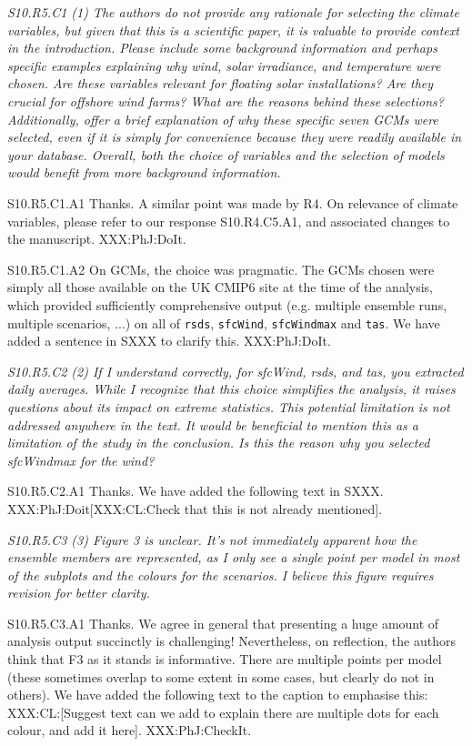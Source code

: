 \documentclass[a4paper,10pt]{article}
\providecommand{\RS}{\texttt{rsds}\xspace}
\providecommand{\WS}{\texttt{sfcWind}\xspace}
\providecommand{\WM}{\texttt{sfcWindmax}\xspace}
\providecommand{\TA}{\texttt{tas}\xspace}
\begin{document}
	\emph{S10.R5.C1 (1) The authors do not provide any rationale for selecting the climate variables, but given that this is a scientific paper, it is valuable to provide context in the introduction. Please include some background information and perhaps specific examples explaining why wind, solar irradiance, and temperature were chosen. Are these variables relevant for floating solar installations? Are they crucial for offshore wind farms? What are the reasons behind these selections? Additionally, offer a brief explanation of why these specific seven GCMs were selected, even if it is simply for convenience because they were readily available in your database. Overall, both the choice of variables and the selection of models would benefit from more background information.}

	S10.R5.C1.A1 Thanks. A similar point was made by R4. On relevance of climate variables, please refer to our response S10.R4.C5.A1, and associated changes to the manuscript. XXX:PhJ:DoIt.
	
	S10.R5.C1.A2 On GCMs, the choice was pragmatic. The GCMs chosen were simply all those available on the UK CMIP6 site at the time of the analysis, which provided sufficiently comprehensive output (e.g. multiple ensemble runs, multiple scenarios, ...) on all of \RS, \WS, \WM and \TA. We have added a sentence in SXXX to clarify this. XXX:PhJ:DoIt.  

	\emph{S10.R5.C2 (2) If I understand correctly, for sfcWind, rsds, and tas, you extracted daily averages. While I recognize that this choice simplifies the analysis, it raises questions about its impact on extreme statistics. This potential limitation is not addressed anywhere in the text. It would be beneficial to mention this as a limitation of the study in the conclusion. Is this the reason why you selected sfcWindmax for the wind?}

	S10.R5.C2.A1 Thanks. We have added the following text in SXXX. XXX:PhJ:Doit[XXX:CL:Check that this is not already mentioned].

	\emph{S10.R5.C3 (3) Figure 3 is unclear. It's not immediately apparent how the ensemble members are represented, as I only see a single point per model in most of the subplots and the colours for the scenarios. I believe this figure requires revision for better clarity.}

	S10.R5.C3.A1 Thanks. We agree in general that presenting a huge amount of analysis output succinctly is challenging! Nevertheless, on reflection, the authors think that F3 as it stands is informative. There are multiple points per model (these sometimes overlap to some extent in some cases, but clearly do not in others). We have added the following text to the caption to emphasise this: XXX:CL:[Suggest text can we add to explain there are multiple dots for each colour, and add it here]. XXX:PhJ:CheckIt.
\end{document}
